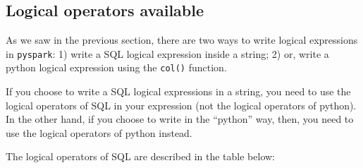\documentclass[
  11pt,
  letterpaper,
  DIV=11,
  numbers=noendperiod]{scrreprt}
\begin{document}
\subsection{Logical operators
available}\label{logical-operators-available}

As we saw in the previous section, there are two ways to write logical
expressions in \texttt{pyspark}: 1) write a SQL logical expression
inside a string; 2) or, write a python logical expression using the
\texttt{col()} function.

If you choose to write a SQL logical expressions in a string, you need
to use the logical operators of SQL in your expression (not the logical
operators of python). In the other hand, if you choose to write in the
``python'' way, then, you need to use the logical operators of python
instead.

The logical operators of SQL are described in the table below:
\end{document}
